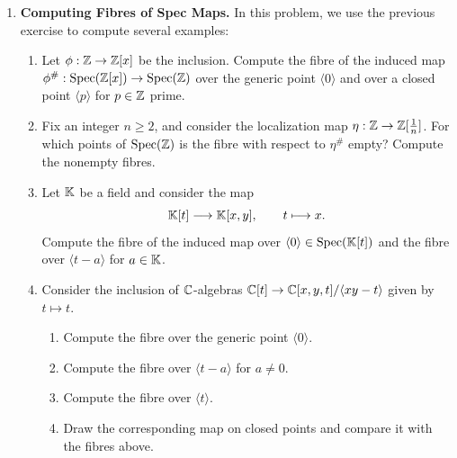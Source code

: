 \documentclass[12pt,reqno]{amsart}
\begin{document}
\begin{enumerate}[leftmargin=*, resume=problems]
\item \textbf{Computing Fibres of Spec Maps.} In this problem, we use the previous exercise to compute several examples:
\begin{enumerate}
	\item Let $\phi:\mathbb{Z}\to \mathbb{Z}[x]$ be the inclusion. Compute the fibre of the induced map $\phi^{\#}:\operatorname{Spec}(\mathbb{Z}[x]) \to \operatorname{Spec}(\mathbb{Z})$ over the generic point $\langle 0\rangle$ and over a closed point $\langle p\rangle$ for $p \in \mathbb{Z}$ prime. 
	\item Fix an integer $n\geq 2$, and consider the localization map $\eta: \mathbb{Z}\to \mathbb{Z}[\frac{1}{n}]$. For which points of $\operatorname{Spec}(\mathbb{Z})$ is the fibre with respect to $\eta^{\#}$ empty? Compute the nonempty fibres.
	\item Let $\mathbb{K}$ be a field and consider the map
\[
\mathbb{K}[t]\longrightarrow \mathbb{K}[x,y],
\qquad
 t\longmapsto x.
\]
Compute the fibre of the induced map over $\langle 0\rangle\in \operatorname{Spec}(\mathbb{K}[t])$ and the fibre over $\langle t-a\rangle$ for $a\in \mathbb{K}$.
\item Consider the inclusion of $\mathbb{C}$-algebras $\mathbb{C}[t] \to \mathbb{C}[x,y,t]/\langle xy-t\rangle$ given by $t \mapsto t$.
\begin{enumerate}
	\item Compute the fibre over the generic point $\langle 0\rangle$.
	\item Compute the fibre over $\langle t-a\rangle$ for $a\neq 0$.
	\item Compute the fibre over $\langle t\rangle$.
	\item Draw the corresponding map on closed points and compare it with the fibres above.
\end{enumerate}
\end{enumerate}

\end{enumerate}
\end{document}
